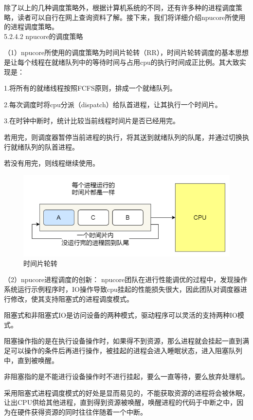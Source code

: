 除了以上的几种调度策略外，根据计算机系统的不同，还有许多种的进程调度策略，读者可以自行在网上查询资料了解。接下来，我们将详细介绍npucore所使用的进程调度策略。
\\[10pt]
5.2.4.2 npucore的调度策略

（1）npucore所使用的调度策略为时间片轮转（RR），时间片轮转调度的基本思想是让每个线程在就绪队列中的等待时间与占用cpu的执行时间成正比例。其大致实现是：

\quad 1.将所有的就绪线程按照FCFS原则，排成一个就绪队列。

\quad 2.每次调度时将cpu分派（dispatch）给队首进程，让其执行一个时间片。

\quad 3.在时钟中断时，统计比较当前线程时间片是否已经用完。

\textbullet 若用完，则调度器暂停当前进程的执行，将其送到就绪队列的队尾，并通过切换执行就绪队列的队首进程。

\textbullet 若没有用完，则线程继续使用。
\begin{figure}
    \centering
    \caption[short]{时间片轮转}
    \includegraphics{figures/05-02-04时间片轮转.png}
\end{figure}
（2）npucore进程调度的创新：
npucore团队在进行性能调优的过程中，发现操作系统运行示例程序时，IO操作导致cpu挂起的性能损失很大，因此团队对调度器进行修改，使其支持阻塞式的进程调度模式。

阻塞式和非阻塞式IO是访问设备的两种模式，驱动程序可以灵活的支持两种IO模式。

\textbullet 阻塞操作指的是在执行设备操作时，如果得不到资源，那么进程就会挂起一直到满足可以操作的条件后再进行操作，被挂起的进程会进入睡眠状态，进入阻塞队列中，直到被唤醒。

\textbullet 非阻塞指的是不能进行设备操作时不进行挂起，要么一直等待，要么放弃处理机。

采用阻塞式进程调度模式的好处是显而易见的，不能获取资源的进程将会被休眠，让出CPU供给其他进程，直到得到资源被唤醒，唤醒进程的代码于中断之中，因为在硬件获得资源的同时往往伴随着一个中断。

